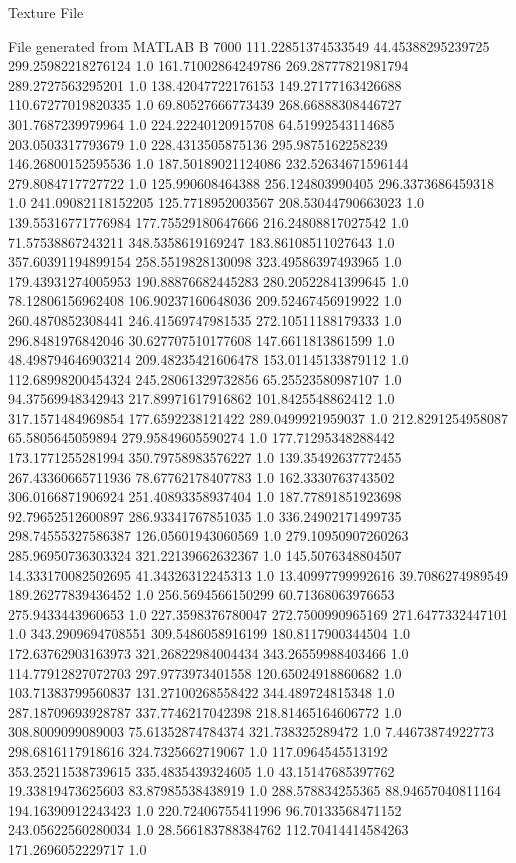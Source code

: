Texture File 

File generated from MATLAB 
B 7000
111.22851374533549	44.45388295239725	299.25982218276124	1.0
161.71002864249786	269.28777821981794	289.2727563295201	1.0
138.42047722176153	149.27177163426688	110.67277019820335	1.0
69.80527666773439	268.66888308446727	301.7687239979964	1.0
224.22240120915708	64.51992543114685	203.0503317793679	1.0
228.4313505875136	295.9875162258239	146.26800152595536	1.0
187.50189021124086	232.52634671596144	279.8084717727722	1.0
125.990608464388	256.124803990405	296.3373686459318	1.0
241.09082118152205	125.7718952003567	208.53044790663023	1.0
139.55316771776984	177.75529180647666	216.24808817027542	1.0
71.57538867243211	348.5358619169247	183.86108511027643	1.0
357.60391194899154	258.5519828130098	323.49586397493965	1.0
179.43931274005953	190.88876682445283	280.20522841399645	1.0
78.12806156962408	106.90237160648036	209.52467456919922	1.0
260.4870852308441	246.41569747981535	272.10511188179333	1.0
296.8481976842046	30.627707510177608	147.6611813861599	1.0
48.498794646903214	209.48235421606478	153.01145133879112	1.0
112.68998200454324	245.28061329732856	65.25523580987107	1.0
94.37569948342943	217.89971617916862	101.8425548862412	1.0
317.1571484969854	177.6592238121422	289.0499921959037	1.0
212.8291254958087	65.5805645059894	279.95849605590274	1.0
177.71295348288442	173.1771255281994	350.79758983576227	1.0
139.35492637772455	267.43360665711936	78.67762178407783	1.0
162.3330763743502	306.0166871906924	251.40893358937404	1.0
187.77891851923698	92.79652512600897	286.93341767851035	1.0
336.24902171499735	298.74555327586387	126.05601943060569	1.0
279.10950907260263	285.96950736303324	321.22139662632367	1.0
145.5076348804507	14.333170082502695	41.34326312245313	1.0
13.40997799992616	39.7086274989549	189.26277839436452	1.0
256.5694566150299	60.71368063976653	275.9433443960653	1.0
227.3598376780047	272.7500990965169	271.6477332447101	1.0
343.2909694708551	309.5486058916199	180.8117900344504	1.0
172.63762903163973	321.26822984004434	343.26559988403466	1.0
114.77912827072703	297.9773973401558	120.65024918860682	1.0
103.71383799560837	131.27100268558422	344.489724815348	1.0
287.18709693928787	337.7746217042398	218.81465164606772	1.0
308.8009099089003	75.61352874784374	321.738325289472	1.0
7.44673874922773	298.6816117918616	324.7325662719067	1.0
117.0964545513192	353.25211538739615	335.4835439324605	1.0
43.15147685397762	19.33819473625603	83.87985538438919	1.0
288.578834255365	88.94657040811164	194.16390912243423	1.0
220.72406755411996	96.70133568471152	243.05622560280034	1.0
28.566183788384762	112.70414414584263	171.2696052229717	1.0
